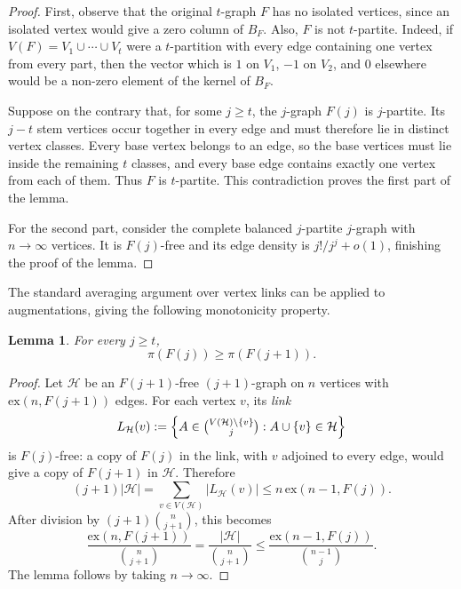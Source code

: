 \documentclass[12pt,a4paper]{article}
\numberwithin{equation}{section}
\newtheorem{lemma}[theorem]{Lemma}
\theoremstyle{definition}
\theoremstyle{remark}
\begin{document}
\begin{proof}
	First, observe that the original $t$-graph $F$ has no isolated vertices, since an isolated vertex would give a zero column of $B_F$.  Also, $F$ is not $t$-partite.  Indeed, if
	\(
	V(F)=V_1\cup\cdots\cup V_t
	\)
	were a $t$-partition with every edge containing one vertex from every part, then the vector which is $1$ on $V_1$, $-1$ on $V_2$, and $0$ elsewhere would be a non-zero element of the kernel of $B_F$.
	
	Suppose on the contrary that, for some $j\ge t$, the $j$-graph $F(j)$ is $j$-partite.  Its $j-t$ stem vertices occur together in every edge and must therefore lie in distinct vertex classes.  Every base vertex belongs to an edge, so the base vertices must lie inside the remaining $t$ classes, and every base edge contains exactly one vertex from each of them.  Thus $F$ is $t$-partite. This contradiction proves the first part of the lemma.
	
	For the second part, consider the complete balanced $j$-partite $j$-graph with $n\to\infty$ vertices. It is $F(j)$-free and its edge density is $j!/j^j+o(1)$, finishing the proof of the lemma.
\end{proof}



The standard averaging argument over vertex links can be applied to augmentations, giving the following monotonicity property.

\begin{lemma}\label{lem:app-augmentation-monotonicity}
	For every $j\ge t$,
	\begin{equation*}
		\pi(F(j))\ge\pi(F(j+1)).
	\end{equation*}
\end{lemma}

\begin{proof}
	Let $\mathcal H$ be an $F(j+1)$-free $(j+1)$-graph on $n$ vertices with $\mathrm{ex}(n,F(j+1))$ edges.  For each vertex $v$, its \emph{link}
	\[
	L_{\mathcal H}(v)
	:=\left\{A\in\tbinom{V(\mathcal H)\setminus\{v\}}j:A\cup\{v\}\in\mathcal H\right\}
	\]
	is $F(j)$-free: a copy of $F(j)$ in the link, with $v$ adjoined to every edge, would give a copy of $F(j+1)$ in $\mathcal H$.  Therefore
	\[
	(j+1)|\mathcal H|
	=\sum_{v\in V(\mathcal H)}|L_{\mathcal H}(v)|
	\le n\,\mathrm{ex}(n-1,F(j)).
	\]
	After division by $(j+1)\binom n{j+1}$, this becomes
	\[
	\frac{\mathrm{ex}(n,F(j+1))}{\binom{n}{j+1}}=\frac{|\mathcal H|}{\binom n{j+1}}
	\le
	\frac{\mathrm{ex}(n-1,F(j))}{\binom{n-1}j}.
	\]
	The lemma follows by taking $n\to\infty$. 
\end{proof}
\end{document}
